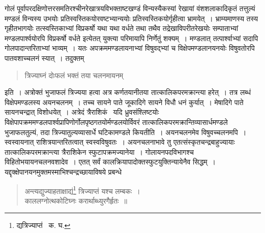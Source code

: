 \documentclass[11pt, openany]{book}
\begin{document}
\noindent गोलं पूर्वापरदक्षिणोत्तरसमतिरश्चीनरेखात्रयविभक्ताष्टखण्डं विन्यस्यैकस्यां रेखायां वंशशलाकादिकृतं तत्तुल्यं मण्डलं विन्यस्य उभयोः प्रतिस्वस्तिकयोरवष्टभ्यान्ययोः प्रतिस्वस्तिकयोर्गृहीत्वा भ्रामयेत्~। भ्राम्यमाणस्य तस्य गृहीतभागयोः तत्स्वस्तिकाभ्यां विप्रकर्षो यथा यथा वर्धते तथा तथैव तद्रेखाविपरीतरेखयोः सम्पाताभ्यां मण्डलपार्श्वयोरपि विप्रकर्षो वर्धते इत्येतत् युक्त्या परिमायापि निर्णेतुं शक्यम्~। मण्डलात्
तत्पार्श्वाभ्यां सदापि गोलपादान्तरिताभ्यां भाव्यम्~। यतः अपक्रममण्डलायनाभ्यां विषुवद्भ्यां च विक्षेपमण्डलानयनयोः विषुवतोरपि
पातवशाच्चलनं स्यात्~। तदुक्तम्\textendash 
\begin{quote}
{\qt त्रिज्याघ्नं दोःफलं भक्तं तया चलनमायनम्}
\end{quote}

\noindent इति~। अत्रोक्तं भुजाफलं त्रिज्यया हत्वा अत्र कर्णतयानीतया तात्कालिकपरमक्रान्त्या हरेत्~। तत्र लब्धं विक्षेपमण्डलस्य अयनचलनम्~। तच्च सायने पाते जूकादिगे सायने विधौ धनं कुर्यात्~। मेषादिगे पाते सायनचन्द्रात् विशोधयेत्~। अत्रेदं त्रैराशिकं \textendash\ यदि ध्रुवसंश्लिष्टयोः विक्षेपापक्रममण्डलपार्श्वप्रापिणोर्गोलपृष्ठगतयोर्मण्डलयोर्विवरं तात्कालिकपरमक्रान्तिव्यासार्धमण्डले भुजाफलतुल्यं, तदा त्रिज्यातुल्यव्यासार्धे घटिकामण्डले कियतीति~। अयनचलनमेव विषुवच्चलनमपि~। स्वस्वायनात् राशित्रयान्तरितत्वात् स्वस्वविषुवतः~। अयनचलनाभावे तु एतत्संस्कृतचन्द्रबाहुज्यायाः तात्कालिकपरमक्रान्त्या त्रैराशिकेन स्फुटापक्रमज्यानेया~। गोलायनपदविभागश्च विहितोभयायनचलनवशादेव~। एतत् सर्वं कालक्रियापादोक्तस्फुटयुक्तिन्यायेनैव सिद्धम्~। यद्दृक्क्षेपानयनमुक्तमस्माभिश्चन्द्रच्छायाविषये प्रबन्धे\textendash 

\begin{quote}
{\qt अन्त्यद्युज्याहताक्षाद्यं\renewcommand{\thefootnote}{१}\footnote{द्यत्रिज्याप्तं \textendash\ क. घ.} त्रिज्याप्तं यश्च लम्बकः~।\\
काललग्नोत्थकोटिघ्नः करार्थाब्ध्युरगैर्हृतः~॥}
\end{quote}

\newpage
\end{document}
